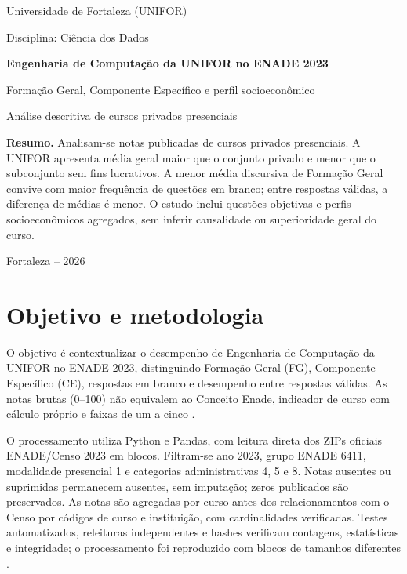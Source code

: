 \documentclass[12pt,a4paper]{article}
\begin{document}
\begin{titlepage}
\centering
{\large Universidade de Fortaleza (UNIFOR)\par}
\vspace{.4cm}
{\large Disciplina: Ciência dos Dados\par}
\vfill
{\LARGE\bfseries Engenharia de Computação da UNIFOR no ENADE 2023\par}
\vspace{.8cm}
{\Large Formação Geral, Componente Específico e perfil socioeconômico\par}
\vspace{.6cm}
{\large Análise descritiva de cursos privados presenciais\par}
\vfill
\begin{minipage}{.92\textwidth}
\textbf{Resumo.} Analisam-se \TotalNotas{} notas publicadas de
\TotalCursos{} cursos privados presenciais. A UNIFOR apresenta média geral
maior que o conjunto privado e menor que o subconjunto sem fins lucrativos.
A menor média discursiva de Formação Geral convive com maior frequência de
questões em branco; entre respostas válidas, a diferença de médias é menor.
O estudo inclui questões objetivas e perfis socioeconômicos agregados, sem
inferir causalidade ou superioridade geral do curso.
\end{minipage}
\vfill
Fortaleza -- 2026
\end{titlepage}

\section{Objetivo e metodologia}
O objetivo é contextualizar o desempenho de Engenharia de Computação da UNIFOR
no ENADE 2023, distinguindo Formação Geral (FG), Componente Específico (CE),
respostas em branco e desempenho entre respostas válidas. As notas brutas
(0--100) não equivalem ao Conceito Enade, indicador de curso com cálculo próprio
e faixas de um a cinco \cite{conceito}.

O processamento utiliza Python e Pandas, com leitura direta dos ZIPs oficiais
ENADE/Censo 2023 em blocos. Filtram-se ano 2023, grupo ENADE 6411, modalidade
presencial 1 e categorias administrativas 4, 5 e 8. Notas ausentes ou suprimidas
permanecem ausentes, sem imputação; zeros publicados são preservados. As notas
são agregadas por curso antes dos relacionamentos com o Censo por códigos de
curso e instituição, com cardinalidades verificadas. Testes automatizados,
releituras independentes e hashes verificam contagens, estatísticas e integridade;
o processamento foi reproduzido com blocos de tamanhos diferentes
\cite{enade,censo,manual}.
\end{document}
